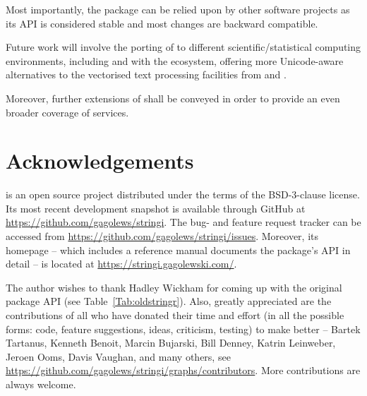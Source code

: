 \documentclass[nojss]{jss}
\begin{document}
Most importantly, the package can be relied upon by other software projects
as its API is considered stable and most changes are backward compatible.

Future work will involve the porting of  to different
scientific/statistical computing environments, including
 and 
with the  \citep{numpy} ecosystem,
offering more Unicode-aware alternatives to the vectorised text processing
facilities from  and  \citep[Chap.~7]{pandas}.

Moreover, further extensions of  shall be conveyed
in order to provide an even broader coverage of  services.






\section*{Acknowledgements}

 is an open source project
distributed under the terms of the BSD-3-clause license.
Its most recent development snapshot is available through GitHub at
\url{https://github.com/gagolews/stringi}. The bug- and feature request
tracker can be accessed from
\url{https://github.com/gagolews/stringi/issues}.
Moreover, its homepage -- which includes a reference manual
documents the package's API in detail --
is located at \url{https://stringi.gagolewski.com/}.

The author wishes to thank Hadley Wickham for coming
up with the original  package API (see Table~\ref{Tab:oldstringr}).
Also, greatly appreciated are the contributions of all who have donated their
time and effort (in all the possible forms: code, feature suggestions,
ideas, criticism, testing) to make  better --
Bartek Tartanus,
Kenneth Benoit,
Marcin Bujarski,
Bill Denney,
Katrin Leinweber,
Jeroen Ooms,
Davis Vaughan,
and many others,
see \url{https://github.com/gagolews/stringi/graphs/contributors}.
More contributions are always welcome.




\end{document}
